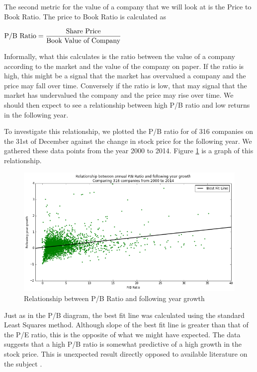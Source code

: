 \documentclass{report}
\begin{document}
The second metric for the value of a company that we will look at is the Price to Book Ratio. The price to Book Ratio is calculated as

\begin{math}
  \\
	\text{P/B Ratio} = \dfrac{\text{Share Price}}{\text{Book Value of Company}}
	\\
\end{math}

Informally, what this calculates is the ratio between the value of a company according to the market and the value of the company on paper. If the ratio is high, this might be a signal that the market has overvalued a company and the price may fall over time. Conversely if the ratio is low, that may signal that the market has undervalued the company and the price may rise over time. We should then expect to see a relationship between high P/B ratio and low returns in the following year. 

To investigate this relationship, we plotted the P/B ratio for of 316 companies on the 31st of December against the change in stock price for the following year. We gathered these data points from the year 2000 to 2014. Figure \ref{fig:pb-abs} is a graph of this relationship.

\begin{figure}[H]
	\caption{Relationship between P/B Ratio and following year growth}
	\centerline{\includegraphics[width=\textwidth]{vis/pb-ratio-abs.png}}
	\label{fig:pb-abs}
\end{figure}

Just as in the P/B diagram, the best fit line was calculated using the standard Least Squares method. Although slope of the best fit line is greater than that of the P/E ratio, this is the opposite of what we might have expected. The data suggests that a high P/B ratio is somewhat  predictive of a high growth in the stock price. This is unexpected result directly opposed to available literature on the subject \cite{jensen1997new}. 
\end{document}
